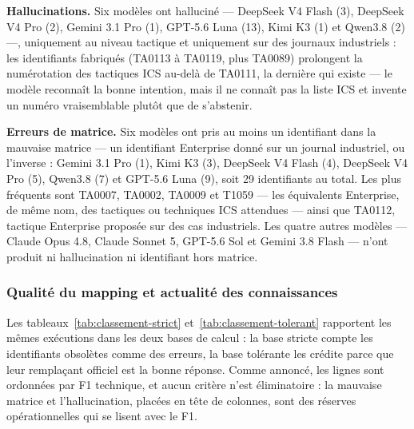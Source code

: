 
\textbf{Hallucinations.} Six modèles ont halluciné --- DeepSeek V4 Flash (3), DeepSeek V4 Pro (2), Gemini 3.1 Pro (1), GPT-5.6 Luna (13), Kimi K3 (1) et Qwen3.8 (2) ---, uniquement au niveau tactique et uniquement sur des journaux industriels : les identifiants fabriqués (TA0113 à TA0119, plus TA0089) prolongent la numérotation des tactiques ICS au-delà de TA0111, la dernière qui existe --- le modèle reconnaît la bonne intention, mais il ne connaît pas la liste ICS et invente un numéro vraisemblable plutôt que de s'abstenir.

\textbf{Erreurs de matrice.} Six modèles ont pris au moins un identifiant dans la mauvaise matrice --- un identifiant Enterprise donné sur un journal industriel, ou l'inverse : Gemini 3.1 Pro (1), Kimi K3 (3), DeepSeek V4 Flash (4), DeepSeek V4 Pro (5), Qwen3.8 (7) et GPT-5.6 Luna (9), soit 29 identifiants au total. Les plus fréquents sont TA0007, TA0002, TA0009 et T1059 --- les équivalents Enterprise, de même nom, des tactiques ou techniques ICS attendues --- ainsi que TA0112, tactique Enterprise proposée sur des cas industriels. Les quatre autres modèles --- Claude Opus 4.8, Claude Sonnet 5, GPT-5.6 Sol et Gemini 3.8 Flash --- n'ont produit ni hallucination ni identifiant hors matrice.

\subsubsection{Qualité du mapping et actualité des connaissances}\label{sec:5-2}

Les tableaux~\ref{tab:classement-strict} et~\ref{tab:classement-tolerant} rapportent les mêmes exécutions dans les deux bases de calcul : la base stricte compte les identifiants obsolètes comme des erreurs, la base tolérante les crédite parce que leur remplaçant officiel est la bonne réponse. Comme annoncé, les lignes sont ordonnées par F1 technique, et aucun critère n'est éliminatoire : la mauvaise matrice et l'hallucination, placées en tête de colonnes, sont des réserves opérationnelles qui se lisent avec le F1.

